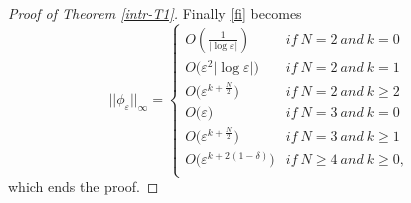 \documentclass[11pt,reqno]{article}
\numberwithin{equation}{section}
\newcommand\e\varepsilon
\newcommand\la\lambda
\begin{document}
\begin{proof}[Proof of Theorem \ref{intr-T1}]
		Finally \eqref{fi} becomes 
		\begin{equation}\label{U1}
			||\phi_\e||_\infty= \begin{cases}
                O\left(\frac{1}{|\log\e|}\right)\quad& if  \ N=2  \ and\ k=0\\
                O\big(\e^2|\log\e|\big) & if  \ N=2  \ and\ k=1\\
                O\big(\e^{k+\frac{N}{2}}\big) & if  \ N=2  \ and\ k\ge 2\\
                O\big(\e\big) & if  \ N=3  \ and\ k=0\\
                O\big(\e^{k+\frac{N}{2}}\big) & if  \ N=3  \ and\ k\ge 1\\
                 O\big(\e^{k+ 2(1-\delta)}\big) & if  \ N\ge 4  \ and\ k\ge 0,\\
            \end{cases}
		\end{equation}
		which ends the proof.
	\end{proof}
\vskip0.1cm
\end{document}
